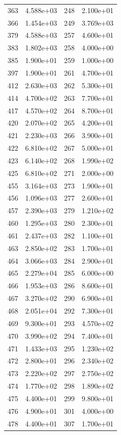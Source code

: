 \documentclass[12pt]{article}
\begin{document}
\begin{longtable}{@{}cccc@{}}
363 & 4.588e+03 & 248 & 2.100e+01 \\
366 & 1.454e+03 & 249 & 3.769e+03 \\
379 & 4.588e+03 & 257 & 4.600e+01 \\
383 & 1.802e+03 & 258 & 4.000e+00 \\
385 & 1.900e+01 & 259 & 1.000e+00 \\
397 & 1.900e+01 & 261 & 4.700e+01 \\
412 & 2.630e+03 & 262 & 5.300e+01 \\
414 & 4.700e+02 & 263 & 7.700e+01 \\
417 & 4.570e+02 & 264 & 8.700e+01 \\
420 & 2.070e+02 & 265 & 4.200e+01 \\
421 & 2.230e+03 & 266 & 3.900e+01 \\
422 & 6.810e+02 & 267 & 5.000e+01 \\
423 & 6.140e+02 & 268 & 1.990e+02 \\
425 & 6.810e+02 & 271 & 2.000e+00 \\
455 & 3.164e+03 & 273 & 1.900e+01 \\
456 & 1.096e+03 & 277 & 2.600e+01 \\
457 & 2.390e+03 & 279 & 1.210e+02 \\
460 & 1.295e+03 & 280 & 2.300e+01 \\
461 & 2.437e+03 & 282 & 1.100e+01 \\
463 & 2.850e+02 & 283 & 1.700e+01 \\
464 & 3.066e+03 & 284 & 2.900e+01 \\
465 & 2.279e+04 & 285 & 6.000e+00 \\
466 & 1.953e+03 & 286 & 8.600e+01 \\
467 & 3.270e+02 & 290 & 6.900e+01 \\
468 & 2.051e+04 & 292 & 7.300e+01 \\
469 & 9.300e+01 & 293 & 4.570e+02 \\
470 & 3.990e+02 & 294 & 7.400e+01 \\
471 & 1.433e+03 & 295 & 1.230e+02 \\
472 & 2.800e+01 & 296 & 2.340e+02 \\
473 & 2.220e+02 & 297 & 2.750e+02 \\
474 & 1.770e+02 & 298 & 1.890e+02 \\
475 & 4.400e+01 & 299 & 9.800e+01 \\
476 & 4.900e+01 & 301 & 4.000e+00 \\
478 & 4.400e+01 & 307 & 1.700e+01 \\

\end{longtable}
\end{document}
